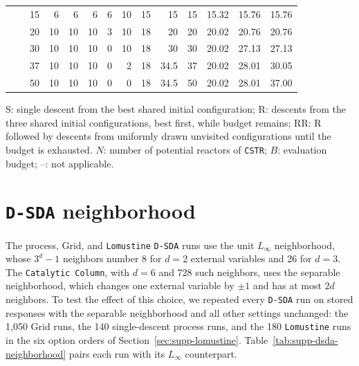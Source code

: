 \begin{table}[htbp]
\begin{threeparttable}
\begin{tabular}{@{}lrrrrrrrrrrrrr@{}}
 &  & 15 & 6 & 6 & 6 & 6 & 10 & 15 & 15 & 15 & 15.32 & 15.76 & 15.76 \\
 &  & 20 & 10 & 10 & 10 & 3 & 10 & 18 & 20 & 20 & 20.02 & 20.76 & 20.76 \\
 &  & 30 & 10 & 10 & 10 & 0 & 10 & 18 & 30 & 30 & 20.02 & 27.13 & 27.13 \\
 &  & 37 & 10 & 10 & 10 & 0 & 2 & 18 & 34.5 & 37 & 20.02 & 28.01 & 30.05 \\
 &  & 50 & 10 & 10 & 10 & 0 & 0 & 18 & 34.5 & 50 & 20.02 & 28.01 & 37.00 \\
\bottomrule
\end{tabular}
\begin{tablenotes}[flushleft]\footnotesize
\item S: single descent from the best shared initial configuration; R: descents from the three shared initial configurations, best first, while budget remains; RR: R followed by descents from uniformly drawn unvisited configurations until the budget is exhausted.
\(N\): number of potential reactors of \texttt{CSTR}; \(B\): evaluation budget; --: not applicable.
\end{tablenotes}
\end{threeparttable}
\end{table}
\FloatBarrier

\clearpage
\section{\texttt{D-SDA} neighborhood}\label{sec:supp-dsda-neighborhood}
The process, Grid, and \texttt{Lomustine} \texttt{D-SDA} runs use the unit \(L_\infty\) neighborhood, whose \(3^d-1\) neighbors number 8 for \(d=2\) external variables and 26 for \(d=3\).
The \texttt{Catalytic Column}, with \(d=6\) and 728 such neighbors, uses the separable neighborhood, which changes one external variable by \(\pm1\) and has at most \(2d\) neighbors.
To test the effect of this choice, we repeated every \texttt{D-SDA} run on stored responses with the separable neighborhood and all other settings unchanged: the 1,050 Grid runs, the 140 single-descent process runs, and the 180 \texttt{Lomustine} runs in the six option orders of Section~\ref{sec:supp-lomustine}.
Table~\ref{tab:supp-dsda-neighborhood} pairs each run with its \(L_\infty\) counterpart.

